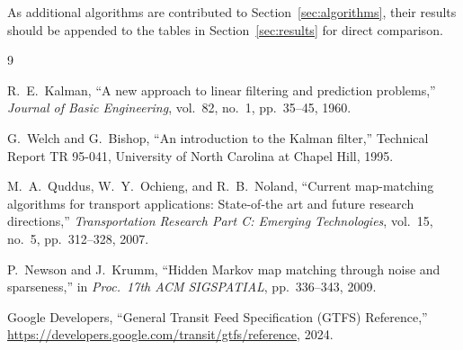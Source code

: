 \documentclass[12pt, a4paper]{article}
\begin{document}
As additional algorithms are contributed to Section~\ref{sec:algorithms},
their results should be appended to the tables in
Section~\ref{sec:results} for direct comparison.

\begin{thebibliography}{9}

R.\ E.\ Kalman,
``A new approach to linear filtering and prediction problems,''
\textit{Journal of Basic Engineering}, vol.\ 82, no.\ 1, pp.\ 35--45, 1960.

G.\ Welch and G.\ Bishop,
``An introduction to the Kalman filter,''
Technical Report TR 95-041, University of North Carolina at Chapel Hill, 1995.

M.\ A.\ Quddus, W.\ Y.\ Ochieng, and R.\ B.\ Noland,
``Current map-matching algorithms for transport applications: State-of-the art
and future research directions,''
\textit{Transportation Research Part C: Emerging Technologies},
vol.\ 15, no.\ 5, pp.\ 312--328, 2007.

P.\ Newson and J.\ Krumm,
``Hidden Markov map matching through noise and sparseness,''
in \textit{Proc.\ 17th ACM SIGSPATIAL}, pp.\ 336--343, 2009.

Google Developers,
``General Transit Feed Specification (GTFS) Reference,''
\url{https://developers.google.com/transit/gtfs/reference}, 2024.

\end{thebibliography}
\end{document}
